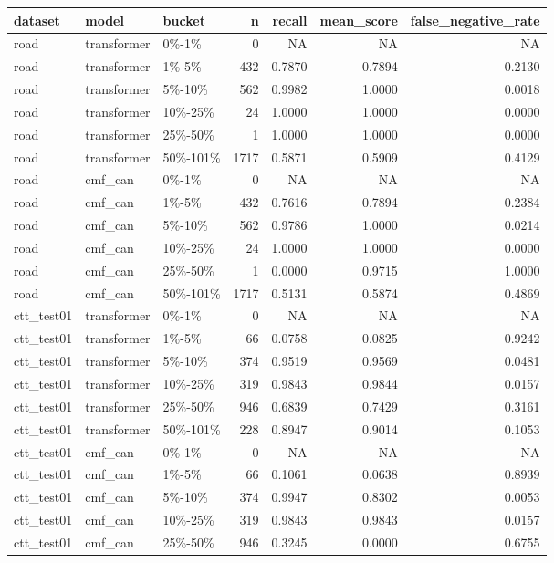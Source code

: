 \begin{tabular}{lllrrrr}
\toprule
dataset & model & bucket & n & recall & mean\_score & false\_negative\_rate \\
\midrule
road & transformer & 0\%-1\% & 0 & NA & NA & NA \\
road & transformer & 1\%-5\% & 432 & 0.7870 & 0.7894 & 0.2130 \\
road & transformer & 5\%-10\% & 562 & 0.9982 & 1.0000 & 0.0018 \\
road & transformer & 10\%-25\% & 24 & 1.0000 & 1.0000 & 0.0000 \\
road & transformer & 25\%-50\% & 1 & 1.0000 & 1.0000 & 0.0000 \\
road & transformer & 50\%-101\% & 1717 & 0.5871 & 0.5909 & 0.4129 \\
road & cmf\_can & 0\%-1\% & 0 & NA & NA & NA \\
road & cmf\_can & 1\%-5\% & 432 & 0.7616 & 0.7894 & 0.2384 \\
road & cmf\_can & 5\%-10\% & 562 & 0.9786 & 1.0000 & 0.0214 \\
road & cmf\_can & 10\%-25\% & 24 & 1.0000 & 1.0000 & 0.0000 \\
road & cmf\_can & 25\%-50\% & 1 & 0.0000 & 0.9715 & 1.0000 \\
road & cmf\_can & 50\%-101\% & 1717 & 0.5131 & 0.5874 & 0.4869 \\
ctt\_test01 & transformer & 0\%-1\% & 0 & NA & NA & NA \\
ctt\_test01 & transformer & 1\%-5\% & 66 & 0.0758 & 0.0825 & 0.9242 \\
ctt\_test01 & transformer & 5\%-10\% & 374 & 0.9519 & 0.9569 & 0.0481 \\
ctt\_test01 & transformer & 10\%-25\% & 319 & 0.9843 & 0.9844 & 0.0157 \\
ctt\_test01 & transformer & 25\%-50\% & 946 & 0.6839 & 0.7429 & 0.3161 \\
ctt\_test01 & transformer & 50\%-101\% & 228 & 0.8947 & 0.9014 & 0.1053 \\
ctt\_test01 & cmf\_can & 0\%-1\% & 0 & NA & NA & NA \\
ctt\_test01 & cmf\_can & 1\%-5\% & 66 & 0.1061 & 0.0638 & 0.8939 \\
ctt\_test01 & cmf\_can & 5\%-10\% & 374 & 0.9947 & 0.8302 & 0.0053 \\
ctt\_test01 & cmf\_can & 10\%-25\% & 319 & 0.9843 & 0.9843 & 0.0157 \\
ctt\_test01 & cmf\_can & 25\%-50\% & 946 & 0.3245 & 0.0000 & 0.6755 \\

\end{tabular}
